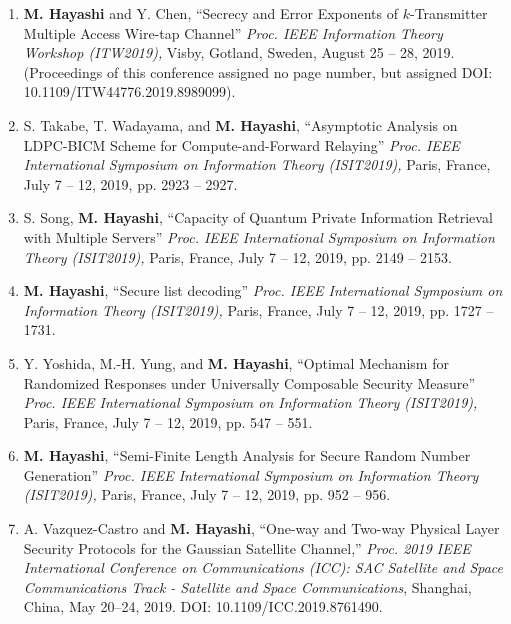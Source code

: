 \documentclass[a4paper,12pt,oneside]{article}
\begin{document}
\begin{enumerate}
    \item
    \textbf{M. Hayashi} and Y. Chen,
    ``Secrecy and Error Exponents of $k$-Transmitter Multiple Access Wire-tap Channel''
    {\em Proc. IEEE Information Theory Workshop (ITW2019),} 
    Visby, Gotland, Sweden, August 25 -- 28, 2019. 
    (Proceedings of this conference assigned no page number, but assigned DOI: 10.1109/ITW44776.2019.8989099).
    
    \item
    S. Takabe, T. Wadayama, and \textbf{M. Hayashi}, 
    ``Asymptotic Analysis on LDPC-BICM Scheme for Compute-and-Forward Relaying''
    {\em Proc. IEEE International Symposium on Information Theory (ISIT2019),} 
    Paris, France, July 7 -- 12, 2019, pp. 2923 -- 2927. 
    
    \item
    S. Song, \textbf{M. Hayashi}, 
    ``Capacity of Quantum Private Information Retrieval with Multiple Servers''
    {\em Proc. IEEE International Symposium on Information Theory (ISIT2019),} 
    Paris, France, July 7 -- 12, 2019, pp. 2149 -- 2153. 
    
    \item
    \textbf{M. Hayashi}, 
    ``Secure list decoding'' 
    {\em Proc. IEEE International Symposium on Information Theory (ISIT2019),} 
    Paris, France, July 7 -- 12, 2019, pp. 1727 -- 1731. 
    
    \item
    Y. Yoshida, M.-H. Yung, and \textbf{M. Hayashi}, 
    ``Optimal Mechanism for Randomized Responses under Universally Composable Security Measure'' 
    {\em Proc. IEEE International Symposium on Information Theory (ISIT2019),} 
    Paris, France, July 7 -- 12, 2019, pp. 547 -- 551. 
    
    \item
    \textbf{M. Hayashi}, 
    ``Semi-Finite Length Analysis for Secure Random Number Generation'' 
    {\em Proc. IEEE International Symposium on Information Theory (ISIT2019),} 
    Paris, France, July 7 -- 12, 2019, pp. 952 -- 956. 
    
    \item
    A. Vazquez-Castro and \textbf{M. Hayashi}, 
    ``One-way and Two-way Physical Layer Security Protocols for the Gaussian Satellite Channel,'' 
    {\em Proc. 2019 IEEE International Conference on Communications (ICC): SAC Satellite and Space Communications Track - Satellite and Space Communications},
    Shanghai, China, May 20--24, 2019. DOI: 10.1109/ICC.2019.8761490.
    

\end{enumerate}
\end{document}
